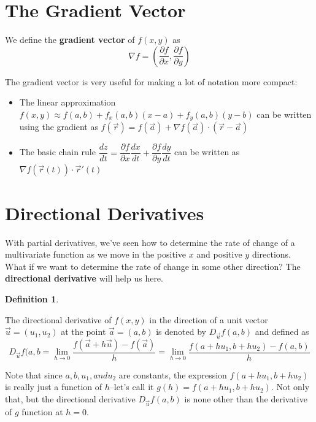 \documentclass[
]{book}
\providecommand{\tightlist}{%
  \setlength{\itemsep}{0pt}\setlength{\parskip}{0pt}}
\theoremstyle{definition}
\newtheorem{definition}{Definition}[chapter]
\theoremstyle{definition}
\theoremstyle{definition}
\theoremstyle{definition}
\theoremstyle{remark}
\begin{document}
\hypertarget{the-gradient-vector}{%
\section{The Gradient Vector}\label{the-gradient-vector}}

We define the \textbf{gradient vector} of \(f(x,y)\) as \[\nabla f = \left(\dfrac{\partial f}{\partial x},\dfrac{\partial f}{\partial y}\right)\]

The gradient vector is very useful for making a lot of notation more compact:

\begin{itemize}
\tightlist
\item
  The linear approximation \(f(x,y)\approx f(a,b)+f_x(a,b)(x-a)+f_y(a,b)(y-b)\) can be written using the gradient as \(f(\vec{r})=f(\vec{a})+\nabla f(\vec{a})\cdot(\vec{r}-\vec{a})\)
\item
  The basic chain rule \(\dfrac{dz}{dt}=\dfrac{\partial f}{\partial x}\dfrac{dx}{dt}+\dfrac{\partial f}{\partial y}\dfrac{dy}{dt}\) can be written as \(\nabla f (\vec{r}(t))\cdot \vec{r}'(t)\)
\end{itemize}

\hypertarget{directional-derivatives}{%
\section{Directional Derivatives}\label{directional-derivatives}}

With partial derivatives, we've seen how to determine the rate of change of a multivariate function as we move in the positive \(x\) and positive \(y\) directions. What if we want to determine the rate of change in some other direction? The \textbf{directional derivative} will help us here.

\begin{definition}
\protect\hypertarget{def:unlabeled-div-48}{}\label{def:unlabeled-div-48}

The directional derivative of \(f(x,y)\) in the direction of a unit vector \(\vec{u}=(u_1, u_2)\) at the point \(\vec{a}=(a,b)\) is denoted by \(D_{\vec{u}}f(a,b)\) and defined as \[D_{\vec{u}}f(a,b=\displaystyle \lim_{h\to 0}\dfrac{f(\vec{a}+h\vec{u})-f(\vec{a})}{h}=\lim _{h\to 0}\dfrac{f(a+hu_1, b+hu_2)-f(a,b)}{h}\]

\end{definition}

Note that since \(a,b,u_1, and u_2\) are constants, the expression \(f(a+hu_1, b+hu_2)\) is really just a function of \(h\)--let's call it \(g(h)=f(a+hu_1, b+hu_2)\). Not only that, but the directional derivative \(D_{\vec{u}}f(a,b)\) is none other than the derivative of \(g\) function at \(h=0\).
\end{document}
